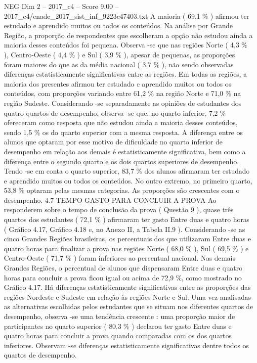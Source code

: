 \begin{textsample}{NEG Dim 2 – 2017\_c4 – Score 9.00 – 2017\_c4/enade\_2017\_sist\_inf\_9223c47403.txt}
A maioria ( 69,1 \% ) afirmou ter estudado e aprendido muitos ou todos os conteúdos.
Na análise por Grande Região, a proporção de respondentes que escolheram a opção não estudou ainda a maioria desses conteúdos foi pequena.
Observa -se que nas regiões Norte ( 4,3 \% ), Centro-Oeste ( 4,4 \% ) e Sul ( 3,9 \% ), apesar de pequenas, as proporções foram maiores do que as da média nacional ( 3,7 \% ), não sendo observadas diferenças estatisticamente significativas entre as regiões.
Em todas as regiões, a maioria dos presentes afirmou ter estudado e aprendido muitos ou todos os conteúdos, com proporções variando entre 61,2 \% na região Norte e 71,0 \% na região Sudeste.
Considerando -se separadamente as opiniões de estudantes dos quatro quartos de desempenho, observa -se que, no quarto inferior, 7,2 \% ofereceram como resposta que não estudou ainda a maioria desses conteúdos, sendo 1,5 \% os do quarto superior com a mesma resposta.
A diferença entre os alunos que optaram por esse motivo de dificuldade no quarto inferior de desempenho em relação aos demais é estatisticamente significativa, bem como a diferença entre o segundo quarto e os dois quartos superiores de desempenho.
Tendo -se em conta o quarto superior, 83,7 \% dos alunos afirmaram ter estudado e aprendido muitos ou todos os conteúdos.
No outro extremo, no primeiro quarto, 53,8 \% optaram pelas mesmas categorias.
As proporções são crescentes com o desempenho. 4.7 TEMPO GASTO PARA CONCLUIR A PROVA Ao responderem sobre o tempo de conclusão da prova ( Questão 9 ), quase três quartos dos estudantes ( 72,1 \% ) afirmaram ter gasto Entre duas e quatro horas ( Gráfico 4.17, Gráfico 4.18 e, no Anexo II, a Tabela II.9 ).
Considerando -se as cinco Grandes Regiões brasileiras, os percentuais dos que utilizaram Entre duas e quatro horas para finalizar a prova nas regiões Norte ( 68,0 \% ), Sul ( 69,5 \% ) e Centro-Oeste ( 71,7 \% ) foram inferiores ao percentual nacional.
Nas demais Grandes Regiões, o percentual de alunos que dispensaram Entre duas e quatro horas para concluir a prova ficou igual ou acima de 72,9 \%, como mostrado no Gráfico 4.17.
Há diferenças estatisticamente significativas entre as proporções das regiões Nordeste e Sudeste em relação às regiões Norte e Sul.
Uma vez analisadas as alternativas escolhidas pelos estudantes que se situam nos diferentes quartos de desempenho, observa -se uma tendência crescente : uma proporção maior de participantes no quarto superior ( 80,3 \% ) declarou ter gasto Entre duas e quatro horas para concluir a prova quando comparadas com os dos quartos inferiores.
Observam -se diferenças estatisticamente significativas dentre todos os quartos de desempenho.

\end{textsample}
